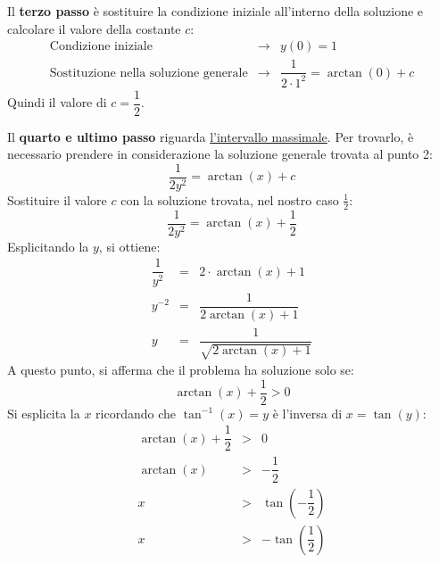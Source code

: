 \documentclass[a4paper]{article}
\begin{document}
	\noindent
	Il \textbf{terzo passo} è sostituire la condizione iniziale all'interno della soluzione e calcolare il valore della costante $c$:
	\begin{equation*}
		\begin{array}{rll}
			\text{Condizione iniziale} &\longrightarrow& y\left(0\right) = 1 \\ [1em]
			\text{Sostituzione nella soluzione generale} &\longrightarrow& \dfrac{1}{2 \cdot 1^{2}} = \arctan\left(0\right) + c
		\end{array}
	\end{equation*}
	Quindi il valore di $c = \dfrac{1}{2}$.\newline

	\noindent
	Il \textbf{quarto e ultimo passo} riguarda \underline{l'intervallo massimale}. Per trovarlo, è necessario prendere in considerazione la soluzione generale trovata al punto 2:
	\begin{equation*}
		\dfrac{1}{2y^{2}} = \arctan\left(x\right) + c
	\end{equation*}
	Sostituire il valore $c$ con la soluzione trovata, nel nostro caso $\frac{1}{2}$:
	\begin{equation*}
		\dfrac{1}{2y^{2}} = \arctan\left(x\right) + \dfrac{1}{2}
	\end{equation*}
	Esplicitando la $y$, si ottiene:
	\begin{equation*}
		\begin{array}{rcl}
			\dfrac{1}{y^{2}} &=& 2 \cdot \arctan\left(x\right) + 1 \\ [1.5em]
			y^{-2} &=& \dfrac{1}{2 \arctan\left(x\right) + 1} \\ [1.5em]
			y &=& \dfrac{1}{\sqrt{2 \arctan\left(x\right) + 1}}
		\end{array}
	\end{equation*}
	A questo punto, si afferma che il problema ha soluzione solo se:
	\begin{equation*}
		\arctan\left(x\right) + \dfrac{1}{2} > 0
	\end{equation*}
	Si esplicita la $x$ ricordando che $\tan^{-1}\left(x\right) = y$ è l'inversa di $x = \tan\left(y\right)$:
	\begin{equation*}
		\begin{array}{rcl}
			\arctan\left(x\right) + \dfrac{1}{2} &>& 0 \\
			\arctan\left(x\right) &>& -\dfrac{1}{2} \\ [1em]
			x &>& \tan\left(-\dfrac{1}{2}\right) \\ [1em]
			x &>& -\tan\left(\dfrac{1}{2}\right)
		\end{array}
	\end{equation*}\newpage
\end{document}
